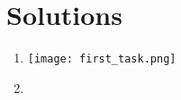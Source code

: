 \documentclass{article}
\begin{document}

\section*{Solutions}
\begin{enumerate}
    \item 
        \centering
        \texttt{[image: first\_task.png]} %
    \item 
\end{enumerate}
\end{document}
